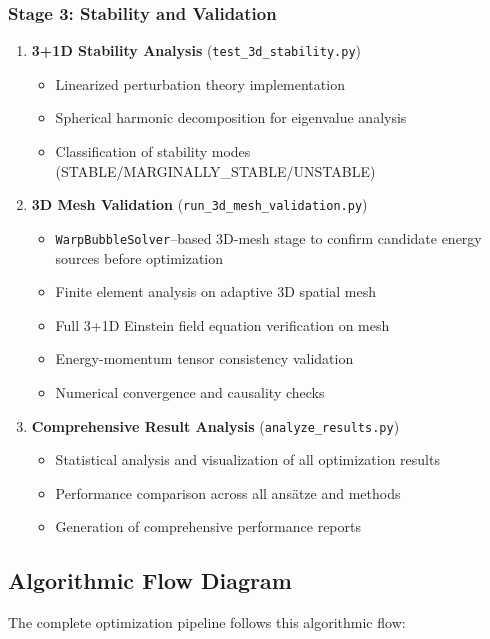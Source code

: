 \documentclass[11pt,a4paper]{article}
\begin{document}
\begin{table}[h]
\begin{table}[h]
\begin{table}[h]
\subsubsection{Stage 3: Stability and Validation}

\begin{enumerate}
\item \textbf{3+1D Stability Analysis} (\texttt{test\_3d\_stability.py})
   \begin{itemize}
   \item Linearized perturbation theory implementation
   \item Spherical harmonic decomposition for eigenvalue analysis
   \item Classification of stability modes (STABLE/MARGINALLY\_STABLE/UNSTABLE)
   \end{itemize}

\item \textbf{3D Mesh Validation} (\texttt{run\_3d\_mesh\_validation.py})
   \begin{itemize}
   \item \texttt{WarpBubbleSolver}--based 3D-mesh stage to confirm candidate energy sources before optimization
   \item Finite element analysis on adaptive 3D spatial mesh
   \item Full 3+1D Einstein field equation verification on mesh
   \item Energy-momentum tensor consistency validation
   \item Numerical convergence and causality checks
   \end{itemize}

\item \textbf{Comprehensive Result Analysis} (\texttt{analyze\_results.py})
   \begin{itemize}
   \item Statistical analysis and visualization of all optimization results
   \item Performance comparison across all ansätze and methods
   \item Generation of comprehensive performance reports
   \end{itemize}
\end{enumerate}

\subsection{Algorithmic Flow Diagram}

The complete optimization pipeline follows this algorithmic flow:


\end{table}
\end{table}
\end{table}
\end{document}
